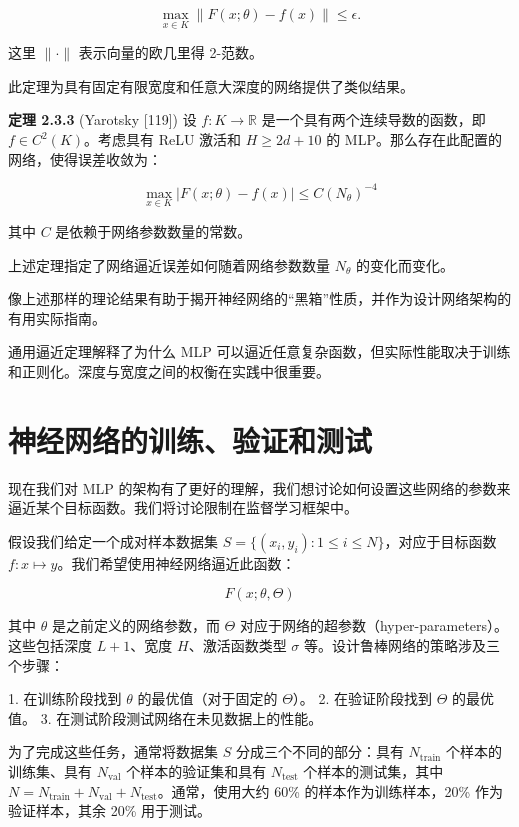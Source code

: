 \[
\max_{x \in K} \| F(x; \theta) - f(x) \| \leq \epsilon.
\]

这里 $\|\cdot\|$ 表示向量的欧几里得 2-范数。

此定理为具有固定有限宽度和任意大深度的网络提供了类似结果。

\textbf{定理 2.3.3} (Yarotsky [119]) 设 $f: K \to \mathbb{R}$ 是一个具有两个连续导数的函数，即 $f \in C^2(K)$。考虑具有 ReLU 激活和 $H \geq 2d + 10$ 的 MLP。那么存在此配置的网络，使得误差收敛为：

\[
\max_{x \in K} |F(x; \theta) - f(x)| \leq C (N_\theta)^{-4}
\]

其中 $C$ 是依赖于网络参数数量的常数。

上述定理指定了网络逼近误差如何随着网络参数数量 $N_\theta$ 的变化而变化。

像上述那样的理论结果有助于揭开神经网络的“黑箱”性质，并作为设计网络架构的有用实际指南。

\begin{mycomment}
通用逼近定理解释了为什么 MLP 可以逼近任意复杂函数，但实际性能取决于训练和正则化。深度与宽度之间的权衡在实践中很重要。
\end{mycomment}

\section{神经网络的训练、验证和测试}

现在我们对 MLP 的架构有了更好的理解，我们想讨论如何设置这些网络的参数来逼近某个目标函数。我们将讨论限制在监督学习框架中。

假设我们给定一个成对样本数据集 $S = \{(x_i, y_i): 1 \leq i \leq N\}$，对应于目标函数 $f: x \mapsto y$。我们希望使用神经网络逼近此函数：

\[
F(x; \theta, \Theta)
\]

其中 $\theta$ 是之前定义的网络参数，而 $\Theta$ 对应于网络的超参数（hyper-parameters）。这些包括深度 $L+1$、宽度 $H$、激活函数类型 $\sigma$ 等。设计鲁棒网络的策略涉及三个步骤：

1. 在训练阶段找到 $\theta$ 的最优值（对于固定的 $\Theta$）。
2. 在验证阶段找到 $\Theta$ 的最优值。
3. 在测试阶段测试网络在未见数据上的性能。

为了完成这些任务，通常将数据集 $S$ 分成三个不同的部分：具有 $N_{\text{train}}$ 个样本的训练集、具有 $N_{\text{val}}$ 个样本的验证集和具有 $N_{\text{test}}$ 个样本的测试集，其中 $N = N_{\text{train}} + N_{\text{val}} + N_{\text{test}}$。通常，使用大约 60\% 的样本作为训练样本，20\% 作为验证样本，其余 20\% 用于测试。

